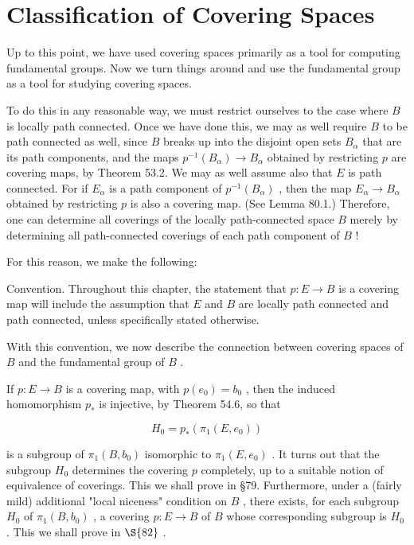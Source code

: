 \chapter{Classification of Covering Spaces}

Up to this point, we have used covering spaces primarily as a tool for computing fundamental groups. Now we turn things around and use the fundamental group as a tool for studying covering spaces.

To do this in any reasonable way, we must restrict ourselves to the case where \(B\) is locally path connected. Once we have done this, we may as well require \(B\) to be path connected as well, since \(B\) breaks up into the disjoint open sets \({B}_{\alpha }\) that are its path components, and the maps \({p}^{-1}\left( {B}_{\alpha }\right)  \rightarrow  {B}_{\alpha }\) obtained by restricting \(p\) are covering maps, by Theorem 53.2. We may as well assume also that \(E\) is path connected. For if \({E}_{\alpha }\) is a path component of \({p}^{-1}\left( {B}_{\alpha }\right)\) , then the map \({E}_{\alpha } \rightarrow  {B}_{\alpha }\) obtained by restricting \(p\) is also a covering map. (See Lemma 80.1.) Therefore, one can determine all coverings of the locally path-connected space \(B\) merely by determining all path-connected coverings of each path component of \(B\) !

For this reason, we make the following:

Convention. Throughout this chapter, the statement that \(p : E \rightarrow  B\) is a covering map will include the assumption that \(E\) and \(B\) are locally path connected and path connected, unless specifically stated otherwise.

With this convention, we now describe the connection between covering spaces of \(B\) and the fundamental group of \(B\) .

If \(p : E \rightarrow  B\) is a covering map, with \(p\left( {e}_{0}\right)  = {b}_{0}\) , then the induced homomorphism \({p}_{ * }\) is injective, by Theorem 54.6, so that

\[
{H}_{0} = {p}_{ * }\left( {{\pi }_{1}\left( {E,{e}_{0}}\right) }\right)
\]

is a subgroup of \({\pi }_{1}\left( {B,{b}_{0}}\right)\) isomorphic to \({\pi }_{1}\left( {E,{e}_{0}}\right)\) . It turns out that the subgroup \({H}_{0}\) determines the covering \(p\) completely, up to a suitable notion of equivalence of coverings. This we shall prove in  \S 79. Furthermore, under a (fairly mild) additional "local niceness" condition on \(B\) , there exists, for each subgroup \({H}_{0}\) of \({\pi }_{1}\left( {B,{b}_{0}}\right)\) , a covering \(p : E \rightarrow  B\) of \(B\) whose corresponding subgroup is \({H}_{0}\) . This we shall prove in \( \S {82}\) .

